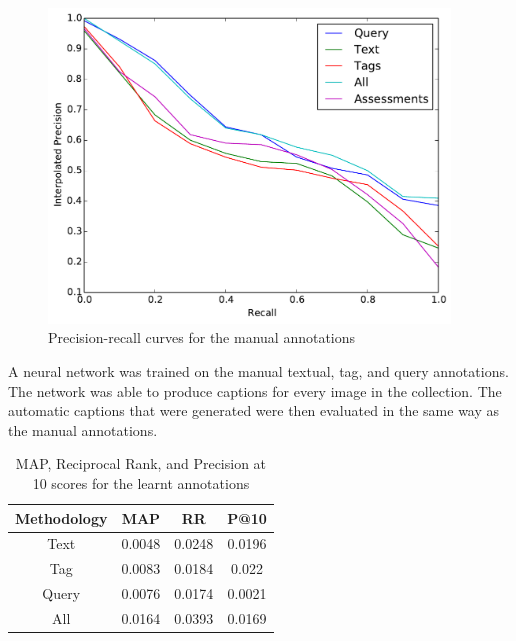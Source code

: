 \begin{figure}[htb]
    \centering
    \includegraphics[width=0.95\textwidth]{graphs/manual-result}
    \caption{Precision-recall curves for the manual annotations}
    \label{fig:manual-result}
\end{figure}

\FloatBarrier

A neural network was trained on the manual textual, tag, and query annotations. The network was able to produce captions for every image in the collection. The automatic captions that were generated were then evaluated in the same way as the manual annotations. 

\begin{table}[h]
    \centering
    \begin{tabular}{|c|c|c|c|}
        \hline
         Methodology & MAP & RR & P@10 \\ \hline
         Text & 0.0048 & 0.0248 & 0.0196 \\ \hline
         Tag & 0.0083 & 0.0184 & 0.022  \\ \hline
         Query & 0.0076 & 0.0174 & 0.0021 \\ \hline
         All & 0.0164 & 0.0393 & 0.0169 \\ \hline
    \end{tabular}
    \caption{MAP, Reciprocal Rank, and Precision at 10 scores for the learnt annotations}
    \label{table:learnt-results}
\end{table}

